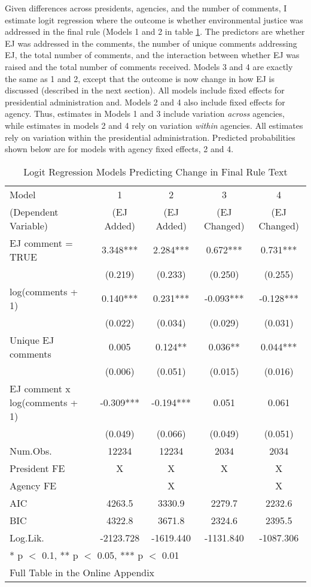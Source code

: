 \documentclass[
      12pt,
        ]{article}
\begin{document}
Given differences across presidents, agencies, and the number of comments, I estimate logit regression where the outcome is whether environmental justice was addressed in the final rule (Models 1 and 2 in table \ref{tab:tables}. The predictors are
whether EJ was addressed in the comments, the number of unique comments addressing EJ, the total number of comments, and the interaction between whether EJ was raised and the total number of comments received. Models 3 and 4 are exactly the same as 1 and 2, except that the outcome is now change in how EJ is discussed (described in the next section). All models include fixed effects for presidential administration and. Models 2 and 4 also include fixed effects for agency. Thus, estimates in Models 1 and 3 include variation \emph{across} agencies, while estimates in models 2 and 4 rely on variation \emph{within} agencies. All estimates rely on variation within the presidential administration.
Predicted probabilities shown below are for models with agency fixed effects, 2 and 4.

\begin{table}[H]
\centering
\caption{\label{tab:tables}Logit Regression Models Predicting Change in Final Rule Text}

\begin{tabular}[t]{lcccc}
\toprule
Model  & 1 & 2 & 3 & 4\\
(Dependent Variable)  & (EJ Added) & (EJ Added) & (EJ Changed) & (EJ Changed)\\
\midrule
EJ comment = TRUE & 3.348*** & 2.284*** & 0.672*** & 0.731***\\
 & (0.219) & (0.233) & (0.250) & (0.255)\\
log(comments + 1) & 0.140*** & 0.231*** & -0.093*** & -0.128***\\
 & (0.022) & (0.034) & (0.029) & (0.031)\\
Unique EJ comments & 0.005 & 0.124** & 0.036** & 0.044***\\
 & (0.006) & (0.051) & (0.015) & (0.016)\\
EJ comment x log(comments + 1) & -0.309*** & -0.194*** & 0.051 & 0.061\\
 & (0.049) & (0.066) & (0.049) & (0.051)\\
\midrule
Num.Obs. & 12234 & 12234 & 2034 & 2034\\
President FE & X & X & X & X\\
Agency FE &  & X &  & X\\
AIC & 4263.5 & 3330.9 & 2279.7 & 2232.6\\
BIC & 4322.8 & 3671.8 & 2324.6 & 2395.5\\
Log.Lik. & -2123.728 & -1619.440 & -1131.840 & -1087.306\\
\bottomrule
\multicolumn{5}{l}{\textsuperscript{} * p $<$ 0.1, ** p $<$ 0.05, *** p $<$ 0.01}\\
\multicolumn{5}{l}{\textsuperscript{} Full Table in the Online Appendix}\\
\end{tabular}
\end{table}
\end{document}
